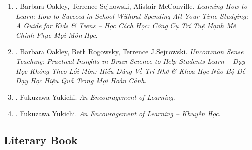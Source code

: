 \documentclass{article}
\begin{document}
\begin{enumerate}
	\item \cite{Oakley_Sejnowski_McConville_learn_how_learn}. Barbara Oakley, Terrence Sejnowski, Alistair McConville. {\it Learning How to Learn: How to Succeed in School Without Spending All Your Time Studying; A Guide for Kids \& Teens -- Học Cách Học: Công Cụ Trí Tuệ Mạnh Mẽ Chinh Phục Mọi Môn Học}.\hfill{\sf[done]}

	\item \cite{Oakley_Rogowsky_Sejnowski_McConville_uncommon_sense_teaching}. Barbara Oakley, Beth Rogowsky, Terrence J.Sejnowski. {\it Uncommon Sense Teaching: Practical Insights in Brain Science to Help Students Learn -- Dạy Học Không Theo Lối Mòn: Hiểu Đúng Về Trí Nhớ \& Khoa Học Não Bộ Để Dạy Học Hiệu Quả Trong Mọi Hoàn Cảnh}.\hfill{\sf[done]}

	\item \cite{Yukichi_encourage_learn}. {\sc Fukuzawa Yukichi}. {\it An Encouragement of Learning}.\hfill{\sf[reading]}

	\item \cite{Yukichi_encourage_learn_VN}. {\sc Fukuzawa Yukichi}. {\it An Encouragement of Learning -- Khuyến Học}.\hfill{\sf[done]}
\end{enumerate}


\subsection{Literary Book}
\end{document}
